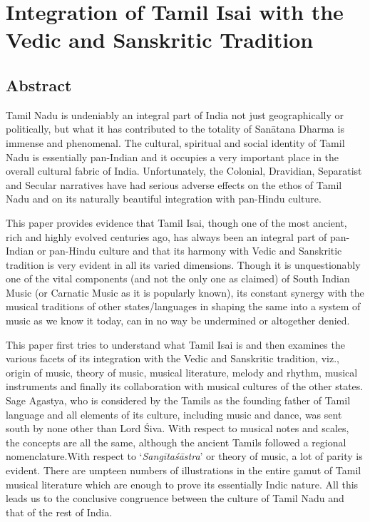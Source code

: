 
\chapter{Integration of Tamil Isai with the Vedic and Sanskritic Tradition}



\section*{Abstract}

Tamil Nadu is undeniably an integral part of India not just geographically or politically, but what it has contributed to the totality of Sanātana Dharma is immense and phenomenal. The cultural, spiritual and social identity of Tamil Nadu is essentially pan-Indian and it occupies a very important place in the overall cultural fabric of India. Unfortunately, the Colonial, Dravidian, Separatist and Secular narratives have had serious adverse effects on the ethos of Tamil Nadu and on its naturally beautiful integration with pan-Hindu culture.

This paper provides evidence that Tamil Isai, though one of the most ancient, rich and highly evolved centuries ago, has always been an integral part of pan-Indian or pan-Hindu culture and that its harmony with Vedic and Sanskritic tradition is very evident in all its varied dimensions. Though it is unquestionably one of the vital components (and not the only one as claimed) of South Indian Music (or Carnatic Music as it is popularly known), its constant synergy with the musical traditions of other states/languages in shaping the same into a system of music as we know it today, can in no way be undermined or altogether denied.

\newpage

This paper first tries to understand what Tamil Isai is and then examines the various facets of its integration with the Vedic and Sanskritic tradition, viz., origin of music, theory of music, musical literature, melody and rhythm, musical instruments and finally its collaboration with musical cultures of the other states. Sage Agastya, who is considered by the Tamils as the founding father of Tamil language and all elements of its culture, including music and dance, was sent south by none other than Lord Śiva. With respect to musical notes and scales, the concepts are all the same, although the ancient Tamils followed a regional nomenclature.With respect to ‘\textit{Sangītaśāstra}’ or theory of music, a lot of parity is evident. There are umpteen numbers of illustrations in the entire gamut of Tamil musical literature which are enough to prove its essentially Indic nature. All this leads us to the conclusive congruence between the culture of Tamil Nadu and that of the rest of India.



